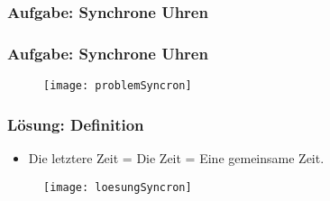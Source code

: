 \documentclass[]{beamer}%
\newcommand{\drawBasis}[5]{%
    \tikzmath{  \sLW=#2;}
    \draw[line width=1pt*\sLW,->] (0,0,0) -- (1,0,0) node[scale=#1, anchor=north east]{$#3$};
    \draw[line width=1pt*\sLW,->] (0,0,0) -- (0,1,0) node[scale=#1, anchor=south]{$#4$};
    \draw[line width=1pt*\sLW,->] (0,0,0) -- (0,0,1) node[scale=#1, anchor=south]{$#5$};
}
\newcommand{\clock}[6]{%
    \begin{scope}[xshift=#1, yshift=#2, scale=#3, line cap=round]
        \tikzmath{
            \sLW = #4;  %
        } 
        \draw [line width=1.6pt*\sLW] (0,0) circle (1.15cm);
        \foreach \angle in {0, 30, ..., 330} 
            \draw[line width=1pt*\sLW] (\angle:0.89cm) -- (\angle:1cm);
        \foreach \angle in {0,90,180,270}
            \draw[line width=1.4pt*\sLW] (\angle:0.82cm) -- (\angle:1cm);
        \draw[line width=1.6pt*\sLW] (0,0) -- (90-30*#5:0.4cm); %
        \draw[line width=1.3pt*\sLW] (0,0) -- (90-6*#6:0.65cm); %
    \end{scope}
}
\newcommand{\guy}[4]{%
    \begin{scope}[xshift=#1,yshift=#2,scale=#3]
        \tikzmath{
            \sLW = #4;  %
        } 
        \draw[line width=2pt*\sLW] (0,0) circle (1cm);               %
        \draw[fill=black] (35:0.3cm) circle (0.08cm*\sLW);           %
        \draw[fill=black] (145:0.3cm) circle (0.08cm*\sLW);          %
        \draw[line width=2pt*\sLW] ([shift={+(0cm,0cm)}]245:0.5cm) arc (245:295:0.5cm);
        
        \draw[line width=2pt*\sLW] (0,-1cm) -- ++(-90:2.25cm);       %
        \draw[line width=2pt*\sLW] (0,-2cm) -- ++(30:1.5cm);         %
        \draw[line width=2pt*\sLW] (0,-2cm) -- ++(150:1.5cm);        %
        \draw[line width=2pt*\sLW] (0,-3.25cm) -- ++(-60:1.5cm);     %
        \draw[line width=2pt*\sLW] (0,-3.25cm) -- ++(240:1.5cm);     %
    \end{scope}
}
\newcommand{\spaceTime}[9]{%
    \begin{scope}[xshift=#1, yshift=#2, scale=#3]
        \tdplotsetmaincoords{55}{30}
        \begin{scope}[scale=1, tdplot_main_coords]
            \drawBasis{#5}{#4}{#6}{#7}{#8}
            \begin{scope}[scale=2]
                \clock{0.43cm}{0.1cm}{0.15}{0.8*#4}{9}{5};
                \begin{scope}[xshift=0.7cm, yshift=0]    
                    \node[scale=#5](0,0){$#9$};
                \end{scope}
            \end{scope}
        \end{scope}
        \tdplotsetmaincoords{0}{0}
    \end{scope}
}
\begin{document}
\begin{frame}
    \frametitle{Aufgabe: Synchrone Uhren}
    \begin{figure}[h]
        \centering
    \end{figure}        
\end{frame}

\begin{frame}
    \frametitle{Aufgabe: Synchrone Uhren}
    \begin{figure}[h]
            \centering
            \texttt{[image: problemSyncron]}
            \caption{\cite{Einstein1905}}
    \end{figure}
\end{frame}

\begin{frame}
    \frametitle{Lösung: Definition}
    \begin{itemize}
        \item Die letztere Zeit = Die Zeit = Eine gemeinsame Zeit. 
    \end{itemize}
    \begin{figure}[h]
            \centering
            \texttt{[image: loesungSyncron]}
            \caption{\cite{Einstein1905}}
    \end{figure}
\end{frame}
\end{document}
